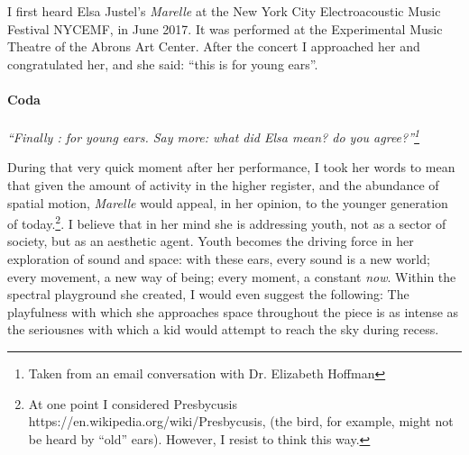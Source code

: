 \documentclass{article}
\begin{document}
\bigskip
\bigskip

I first heard Elsa Justel's \textit{Marelle} at the New York City Electroacoustic Music Festival NYCEMF, in June 2017. It was performed at the Experimental Music Theatre of the Abrons Art Center. After the concert I approached her and congratulated her, and she said: ``this is for young ears''.
\bigskip
\bigskip
\paragraph{Coda}
\textit{
``Finally : for young ears.  Say more: what did Elsa mean? do you agree?''\footnote{Taken from an email conversation with Dr. Elizabeth Hoffman}}
\bigskip

During that very quick moment after her performance, I took her words to mean that given the amount of activity in the higher register, and the abundance of spatial motion, \emph{Marelle} would appeal, in her opinion, to the younger generation of today.\footnote{At one point I considered Presbycusis https://en.wikipedia.org/wiki/Presbycusis, (the bird, for example, might not be heard by ``old'' ears). However, I resist to think this way.}. I believe that in her mind she is addressing youth, not as a sector of society, but as an aesthetic agent. Youth becomes the driving force in her exploration of sound and space: with these ears, every sound is a new world; every movement, a new way of being; every moment, a constant \emph{now}. Within the spectral playground she created, I would even suggest the following: The playfulness with which she approaches space throughout the piece is as intense as the seriousnes with which a kid would attempt to reach the sky during recess.


\end{document}
